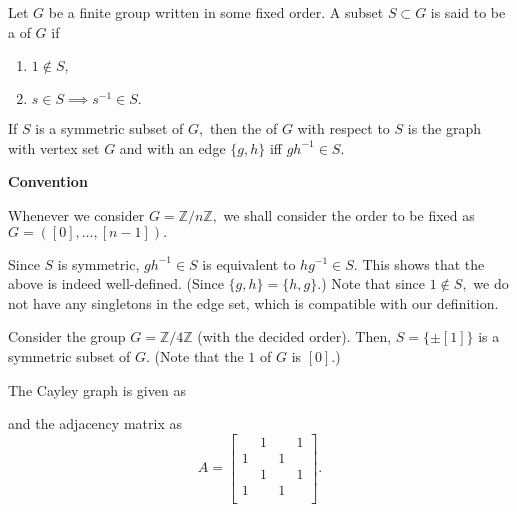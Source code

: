 \begin{defn}%
    Let $G$ be a finite group written in some fixed order. A subset $S \subset G$ is said to be a  of $G$ if
    \begin{enumerate}
        \item $1 \notin S,$
        \item $s \in S \implies s^{-1} \in S.$
    \end{enumerate}
    If $S$ is a symmetric subset of $G,$ then the  of $G$ with respect to $S$ is the graph with vertex set $G$ and with an edge $\{g, h\}$ iff $gh^{-1} \in S.$
\end{defn}

\begin{aside}
    \textbf{Convention}

    Whenever we consider $G = \mathbb{Z}/n\mathbb{Z},$ we shall consider the order to be fixed as $G = ([0], \ldots, [n - 1]).$
\end{aside}

\begin{rem}
    Since $S$ is symmetric, $gh^{-1} \in S$ is equivalent to $hg^{-1} \in S.$ This shows that the above is indeed well-defined. (Since $\{g, h\} = \{h, g\}.$) Note that since $1 \notin S,$ we do not have any singletons in the edge set, which is compatible with our definition.
\end{rem}

\begin{ex}
    Consider the group $G = \mathbb{Z}/4\mathbb{Z}$ (with the decided order). Then, $S = \{\pm [1]\}$ is a symmetric subset of $G.$ (Note that the $1$ of $G$ is $[0].$)

    The Cayley graph is given as

    \begin{center}
        \captionsetup{type=figure}
         \label{fig:cayleyz4z}
    \end{center}
    and the adjacency matrix as
    \begin{equation*} 
        A = \begin{bmatrix}
            & 1 & & 1\\
             1 &&  1&\\
            & 1 & & 1\\
             1 &&  1&\\
        \end{bmatrix}.
    \end{equation*}
\end{ex}  

